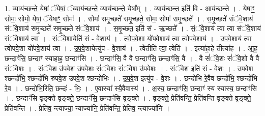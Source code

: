 \documentclass[17pt]{extarticle}
\begin{document}
1. व्याय॑च्छन्ते॒ येषां॒ ॅयेषां॒ ॅव्याय॑च्छन्ते॒ व्याय॑च्छन्ते॒ येषा᳚म् । . व्याय॑च्छन्त॒ इति॑ वि - आय॑च्छन्ते । . येषाꣳ॒॒ सोमः॒ सोमो॒ येषां॒ ॅयेषाꣳ॒॒ सोमः॑ । . सोमः॑ समृ॒च्छते॑ समृ॒च्छते॒ सोमः॒ सोमः॑ समृ॒च्छते᳚ । . स॒मृ॒च्छते॑ संॅवे॒शाय॑ संॅवे॒शाय॑ समृ॒च्छते॑ समृ॒च्छते॑ संॅवे॒शाय॑ । . स॒मृ॒च्छत॒ इति॑ सं - ऋ॒च्छते᳚ । . सं॒ॅवे॒शाय॑ त्वा त्वा संॅवे॒शाय॑ संॅवे॒शाय॑ त्वा । . सं॒ॅवे॒शायेति॑ सं - वे॒शाय॑ । . त्वो॒प॒वे॒शा यो॑पवे॒शाय॑ त्वा त्वोपवे॒शाय॑ । . उ॒प॒वे॒शाय॑ त्वा त्वोपवे॒शा यो॑पवे॒शाय॑ त्वा । . उ॒प॒वे॒शायेत्यु॑प - वे॒शाय॑ । . त्वेतीति॑ त्वा॒ त्वेति॑ । . इत्या॑हा॒हे तीत्या॑ह । . आ॒ह॒ छन्दाꣳ॑सि॒ छन्दाꣳ॑ स्याहाह॒ छन्दाꣳ॑सि । . छन्दाꣳ॑सि॒ वै वै छन्दाꣳ॑सि॒ छन्दाꣳ॑सि॒ वै । . वै सं॑ॅवे॒शः सं॑ॅवे॒शो वै वै सं॑ॅवे॒शः । . सं॒ॅवे॒श उ॑पवे॒श उ॑पवे॒शः सं॑ॅवे॒शः सं॑ॅवे॒श उ॑पवे॒शः । . सं॒ॅवे॒श इति॑ सं - वे॒शः । . उ॒प॒वे॒श श्छन्दो॑भि॒ श्छन्दो॑भि रुपवे॒श उ॑पवे॒श श्छन्दो॑भिः । . उ॒प॒वे॒श इत्यु॑प - वे॒शः । . छन्दो॑भि रे॒वैव छन्दो॑भि॒ श्छन्दो॑भि रे॒व । . छन्दो॑भि॒रिति॒ छन्दः॑ - भिः॒ । . ए॒वास्या᳚ स्यै॒वैवास्य॑ । . अ॒स्य॒ छन्दाꣳ॑सि॒ छन्दाꣳ॑ स्य स्यास्य॒ छन्दाꣳ॑सि । . छन्दाꣳ॑सि वृङ्क्ते वृङ्क्ते॒ छन्दाꣳ॑सि॒ छन्दाꣳ॑सि वृङ्क्ते । . वृ॒ङ्क्ते॒ प्रेति॑वन्ति॒ प्रेति॑वन्ति वृङ्क्ते वृङ्क्ते॒ प्रेति॑वन्ति । . प्रेति॑व॒ न्त्याज्या॒ न्याज्या॑नि॒ प्रेति॑वन्ति॒ प्रेति॑व॒ न्त्याज्या॑नि । \newline
\end{document}
